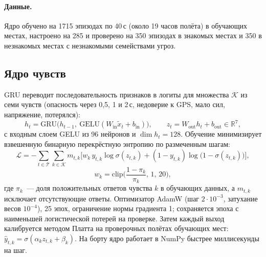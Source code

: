 \documentclass[10pt]{article}
\begin{document}
\paragraph{Данные.} Ядро обучено на 1715 эпизодах по 40\,с (около 19 часов полёта) в обучающих местах, настроено на 285 и
проверено на 350 эпизодах в знакомых местах и 350 в незнакомых местах с незнакомыми семействами угроз.

\subsection{Ядро чувств}
GRU \citep{cho2014gru} переводит последовательность признаков в логиты для множества $\mathcal K$ из семи чувств (опасность через
0,5, 1 и 2\,с, недоверие к GPS, мало сил, напряжение, потерялся):
\begin{equation}\label{eq:gru}
h_t=\mathrm{GRU}\big(h_{t-1},\ \mathrm{GELU}(W_{\mathrm{in}}\tilde x_t+b_{\mathrm{in}})\big),\qquad z_t=W_{\mathrm{out}}h_t+b_{\mathrm{out}}\in\mathbb{R}^{7},
\end{equation}
с входным слоем GELU \citep{hendrycks2016gelu} из 96 нейронов и $\dim h_t=128$. Обучение минимизирует взвешенную бинарную перекрёстную энтропию по размеченным
шагам:
\begin{equation}
\mathcal L=-\sum_{t\in\mathcal T}\sum_{k\in\mathcal K} m_{t,k}\Big[w_k\,y_{t,k}\log\sigma(z_{t,k})+(1-y_{t,k})\log\big(1-\sigma(z_{t,k})\big)\Big],
\end{equation}
\begin{equation}
w_k=\mathrm{clip}\Big(\frac{1-\pi_k}{\pi_k},\,1,\,20\Big),
\end{equation}
где $\pi_k$~--- доля положительных ответов чувства $k$ в обучающих данных, а $m_{t,k}$ исключает отсутствующие ответы.
Оптимизатор AdamW \citep{loshchilov2019adamw} (шаг $2\cdot10^{-3}$, затухание весов $10^{-4}$), 25 эпох, ограничение нормы
градиента 1; сохраняется эпоха с наименьшей логистической потерей на проверке. Затем каждый выход калибруется методом Платта
\citep{platt1999} на проверочных полётах обучающих мест: $\hat y_{t,k}=\sigma(\alpha_k z_{t,k}+\beta_k)$. На борту ядро работает в
NumPy быстрее миллисекунды на шаг.
\end{document}
